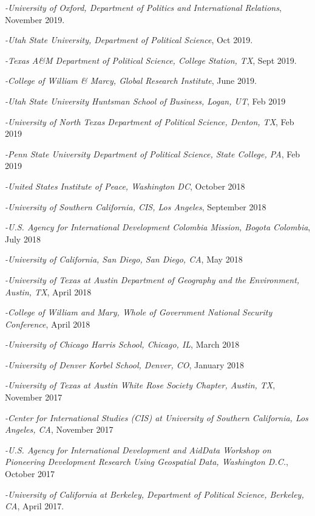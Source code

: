 \documentclass[10pt]{article}
\begin{document}
\begin{etaremune}
\item\textit{-University of Oxford, Department of Politics and International Relations}, November 2019.
\item\textit{-Utah State University, Department of Political Science}, Oct 2019.
\item\textit{-Texas A\&M Department of Political Science, College Station, TX}, Sept 2019. 
\item\textit{-College of William \& Marcy, Global Research Institute}, June 2019.
\item\textit{-Utah State University Huntsman School of Business, Logan, UT}, Feb 2019
\item\textit{-University of North Texas Department of Political Science, Denton, TX}, Feb 2019
\item\textit{-Penn State University Department of Political Science, State College, PA}, Feb 2019
\item\textit{-United States Institute of Peace, Washington DC}, October 2018
\item \textit{-University of Southern California, CIS, Los Angeles}, September 2018
\item\textit{-U.S. Agency for International Development Colombia Mission, Bogota Colombia}, July 2018
\item \textit{-University of California, San Diego, San Diego, CA}, May 2018
\item \textit{-University of Texas at Austin Department of Geography and the Environment, Austin, TX}, April 2018
\item \textit{-College of William and Mary, Whole of Government National Security Conference}, April 2018
\item \textit{-University of Chicago Harris School, Chicago, IL}, March 2018
\item \textit{-University of Denver Korbel School, Denver, CO}, January 2018
\item \textit{-University of Texas at Austin White Rose Society Chapter, Austin, TX}, November 2017
\item \textit{-Center for International Studies (CIS) at University of Southern California, Los Angeles, CA}, November 2017
\item \textit{-U.S. Agency for International Development and AidData Workshop on Pioneering Development Research Using Geospatial Data, Washington D.C.}, October 2017
\item\textit{-University of California at Berkeley, Department of Political Science, Berkeley, CA}, April 2017.

\end{etaremune}
\end{document}
